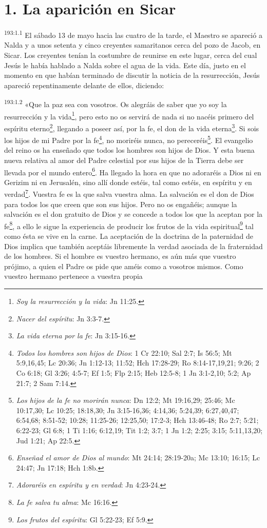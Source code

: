\section*{1. La aparición en Sicar}
\par
\textsuperscript{193:1.1} El sábado 13 de mayo hacia las cuatro de la tarde, el Maestro se apareció a Nalda y a unos setenta y cinco creyentes samaritanos cerca del pozo de Jacob, en Sicar. Los creyentes tenían la costumbre de reunirse en este lugar, cerca del cual Jesús le había hablado a Nalda sobre el agua de la vida. Este día, justo en el momento en que habían terminado de discutir la noticia de la resurrección, Jesús apareció repentinamente delante de ellos, diciendo:

\par
\textsuperscript{193:1.2} «Que la paz sea con vosotros. Os alegráis de saber que yo soy la resurrección y la vida\footnote{\textit{Soy la resurrección y la vida}: Jn 11:25.}, pero esto no os servirá de nada si no nacéis primero del espíritu eterno\footnote{\textit{Nacer del espíritu}: Jn 3:3-7.}, llegando a poseer así, por la fe, el don de la vida eterna\footnote{\textit{La vida eterna por la fe}: Jn 3:15-16.}. Si sois los hijos de mi Padre por la fe\footnote{\textit{Todos los hombres son hijos de Dios}: 1 Cr 22:10; Sal 2:7; Is 56:5; Mt 5:9,16,45; Lc 20:36; Jn 1:12-13; 11:52; Hch 17:28-29; Ro 8:14-17,19,21; 9:26; 2 Co 6:18; Gl 3:26; 4:5-7; Ef 1:5; Flp 2:15; Heb 12:5-8; 1 Jn 3:1-2,10; 5:2; Ap 21:7; 2 Sam 7:14.}, no moriréis nunca, no pereceréis\footnote{\textit{Los hijos de la fe no morirán nunca}: Dn 12:2; Mt 19:16,29; 25:46; Mc 10:17,30; Lc 10:25; 18:18,30; Jn 3:15-16,36; 4:14,36; 5:24,39; 6:27,40,47; 6:54,68; 8:51-52; 10:28; 11:25-26; 12:25,50; 17:2-3; Hch 13:46-48; Ro 2:7; 5:21; 6:22-23; Gl 6:8; 1 Ti 1:16; 6:12,19; Tit 1:2; 3:7; 1 Jn 1:2; 2:25; 3:15; 5:11,13,20; Jud 1:21; Ap 22:5.}. El evangelio del reino os ha enseñado que todos los hombres son hijos de Dios. Y esta buena nueva relativa al amor del Padre celestial por sus hijos de la Tierra debe ser llevada por el mundo entero\footnote{\textit{Enseñad el amor de Dios al mundo}: Mt 24:14; 28:19-20a; Mc 13:10; 16:15; Lc 24:47; Jn 17:18; Hch 1:8b.}. Ha llegado la hora en que no adoraréis a Dios ni en Gerizim ni en Jerusalén, sino allí donde estéis, tal como estéis, en espíritu y en verdad\footnote{\textit{Adoraréis en espíritu y en verdad}: Jn 4:23-24.}. Vuestra fe es la que salva vuestra alma. La salvación es el don de Dios para todos los que creen que son sus hijos. Pero no os engañéis; aunque la salvación es el don gratuito de Dios y se concede a todos los que la aceptan por la fe\footnote{\textit{La fe salva tu alma}: Mc 16:16.}, a ello le sigue la experiencia de producir los frutos de la vida espiritual\footnote{\textit{Los frutos del espíritu}: Gl 5:22-23; Ef 5:9.} tal como ésta se vive en la carne. La aceptación de la doctrina de la paternidad de Dios implica que también aceptáis libremente la verdad asociada de la fraternidad de los hombres. Si el hombre es vuestro hermano, es aún más que vuestro prójimo, a quien el Padre os pide que améis como a vosotros mismos. Como vuestro hermano pertenece a vuestra propia 